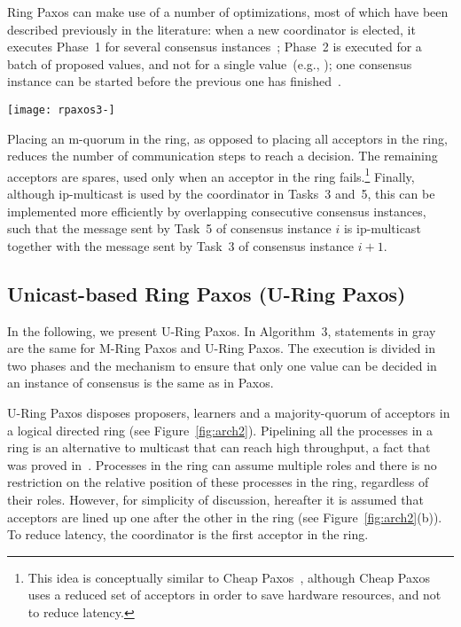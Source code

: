 \documentclass[final,3p,times,twocolumn,authoryear]{elsarticle}
\begin{document}
Ring Paxos can make use of a number of optimizations, most of which have been described previously in the literature: when a new coordinator is elected, it executes Phase~1 for several consensus instances~\cite{Lam98}; Phase~2 is executed for a batch of proposed values, and not for a single value~(e.g., \cite{KA08}); one consensus instance can be started before the previous one has finished~\cite{Lam98}.

\begin{figure*}
  \begin{center}
	\texttt{[image: rpaxos3-]}
	\vspace{-8mm}\caption{U-Ring Paxos.}
\label{fig:arch2}
  \end{center}
\end{figure*}

Placing an m-quorum in the ring, as opposed to placing all acceptors in the ring, reduces the number of communication steps to reach a decision. The remaining acceptors are spares, used only when an acceptor in the ring fails.\footnote{This idea is conceptually similar to Cheap Paxos~\cite{LM04}, although Cheap Paxos uses a reduced set of acceptors in order to save hardware resources, and not to reduce latency.} Finally, although ip-multicast is used by the coordinator in Tasks~3 and~5, this can be implemented more efficiently by overlapping consecutive consensus instances, such that the message sent by Task~5 of consensus instance $i$ is ip-multicast together with the message sent by Task~3 of consensus instance $i+1$.



\subsection{Unicast-based Ring Paxos (U-Ring Paxos)}
\label{sec:unirpaxos}

In the following, we present U-Ring Paxos. In Algorithm~3, statements in gray are the same for M-Ring Paxos and U-Ring Paxos. The execution is divided in two phases and the mechanism to ensure that only one value can be decided in an instance of consensus is the same as in Paxos.


U-Ring Paxos disposes proposers, learners and a majority-quorum of acceptors in a logical directed ring (see Figure~\ref{fig:arch2}). Pipelining all the processes in a ring is an alternative to multicast that can reach high throughput, a fact that was proved in~\cite{Guerraoui2010}. Processes in the ring can assume multiple roles and there is no restriction on the relative position of these processes in the ring, regardless of their roles. However, for simplicity of discussion, hereafter it is assumed that acceptors are lined up one after the other in the ring (see Figure~\ref{fig:arch2}(b)). To reduce latency, the coordinator is the first acceptor in the ring.
\end{document}
